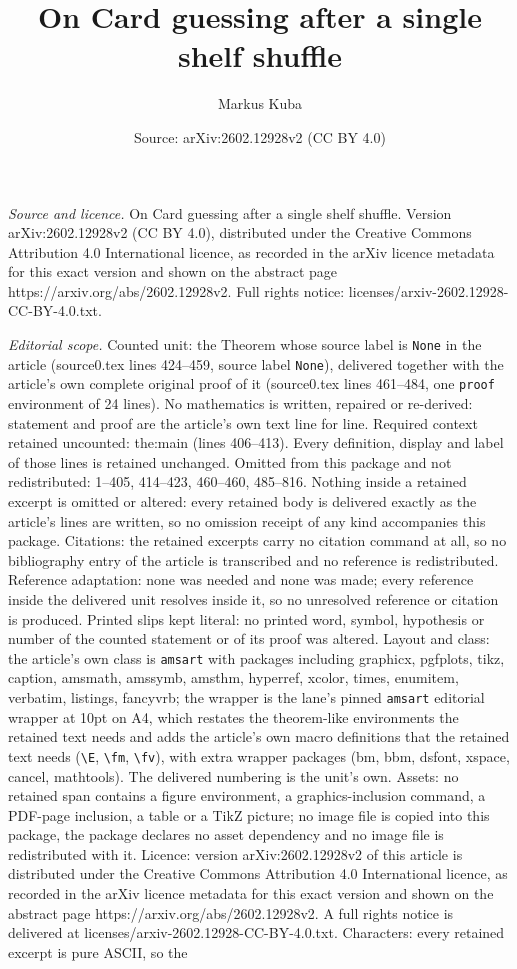 \documentclass[10pt,a4paper]{amsart}
\title[On Card guessing after a single shelf shuffle]{On Card guessing after a single shelf shuffle}
\author{Markus Kuba}
\date{Source: arXiv:2602.12928v2 (CC BY 4.0)}
\begin{document}
\maketitle

\noindent\emph{Source and licence.} On Card guessing after a single shelf shuffle. Version arXiv:2602.12928v2 (CC BY 4.0), distributed under the Creative Commons Attribution 4.0 International licence, as recorded in the arXiv licence metadata for this exact version and shown on the abstract page https://arxiv.org/abs/2602.12928v2. Full rights notice: licenses/arxiv-2602.12928-CC-BY-4.0.txt.\par\smallskip

\noindent\textit{Editorial scope.} Counted unit: the Theorem whose source label is \texttt{None} in the article (source0.tex lines 424--459, source label \texttt{None}), delivered together with the article's own complete original proof of it (source0.tex lines 461--484, one \texttt{proof} environment of 24 lines). No mathematics is written, repaired or re-derived: statement and proof are the article's own text line for line. Required context retained uncounted: the:main (lines 406--413). Every definition, display and label of those lines is retained unchanged. Omitted from this package and not redistributed: 1--405, 414--423, 460--460, 485--816. Nothing inside a retained excerpt is omitted or altered: every retained body is delivered exactly as the article's lines are written, so no omission receipt of any kind accompanies this package. Citations: the retained excerpts carry no citation command at all, so no bibliography entry of the article is transcribed and no reference is redistributed. Reference adaptation: none was needed and none was made; every reference inside the delivered unit resolves inside it, so no unresolved reference or citation is produced. Printed slips kept literal: no printed word, symbol, hypothesis or number of the counted statement or of its proof was altered. Layout and class: the article's own class is \texttt{amsart} with packages including graphicx, pgfplots, tikz, caption, amsmath, amssymb, amsthm, hyperref, xcolor, times, enumitem, verbatim, listings, fancyvrb; the wrapper is the lane's pinned \texttt{amsart} editorial wrapper at 10pt on A4, which restates the theorem-like environments the retained text needs and adds the article's own macro definitions that the retained text needs (\texttt{\textbackslash E}, \texttt{\textbackslash fm}, \texttt{\textbackslash fv}), with extra wrapper packages (bm, bbm, dsfont, xspace, cancel, mathtools). The delivered numbering is the unit's own. Assets: no retained span contains a figure environment, a graphics-inclusion command, a PDF-page inclusion, a table or a TikZ picture; no image file is copied into this package, the package declares no asset dependency and no image file is redistributed with it. Licence: version arXiv:2602.12928v2 of this article is distributed under the Creative Commons Attribution 4.0 International licence, as recorded in the arXiv licence metadata for this exact version and shown on the abstract page https://arxiv.org/abs/2602.12928v2. A full rights notice is delivered at licenses/arxiv-2602.12928-CC-BY-4.0.txt. Characters: every retained excerpt is pure ASCII, so the 
\end{document}
